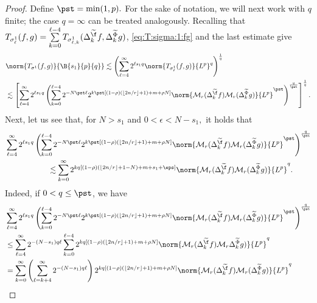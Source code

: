 \begin{proof}
  Define $\pst=\min(1,p).$  For the sake of notation, we will next work with $q$ finite; the case $q=\infty$ can be treated analogously.
  Recalling that $T_{\sigma^1_\ell}(f,g)= \sum\limits_{k=0}^{\ell -4} T_{\sigma^1_{\ell,k}}(\Delta^{\widetilde{\f}}_k f,\Delta^{\widetilde{\Phi}}_k g)$,  \eqref{eq:T:sigma:1:fg} and the last  estimate give
\begin{align}
& \norm{T_{\sigma^1}(f,g)}{\B{s_1}{p}{q}}  \lesssim  \left( \sum\limits_{\ell=4}^\infty 2^{\ell s_1q} \norm{T_{\sigma^1_\ell}(f,g)}{L^p}^q \right)^\frac{1}{q}\label{eq:T1:fg:Fqp}\\
& \lesssim  \left[  \sum\limits_{\ell=4}^\infty 2^{\ell s_1 q} \left(  \sum\limits_{k=0}^{\ell -4} 2^{- N\pst \ell} 2^{k\pst [(1-\rho)( \lfloor{2n/r}\rfloor + 1)+m+\rho N]}   \norm{\mathcal{M}_r(\Delta^{\widetilde{\f}}_kf)\mathcal{M}_r(\Delta^{\widetilde{\Phi}}_k g)}{L^p}^{\pst}\right)^\frac{q}{\pst} \right]^\frac{1}{q}. \nonumber
\end{align}
Next, let us see that, for  $N>s_1$ and $0<\epsilon< N-s_1,$  it holds that
\begin{align}\nonumber
& \sum\limits_{\ell=4}^\infty 2^{\ell  s_1 q} \left(  \sum\limits_{k=0}^{\ell -4} 2^{- N \pst\ell} 2^{k \pst[(1-\rho)( \lfloor{2n/r}\rfloor + 1)+m+\rho N]}    \norm{\mathcal{M}_r(\Delta^{\widetilde{\f}}_k f)\mathcal{M}_r(\Delta^{\widetilde{\Phi}}_kg)}{L^p}^{\pst}\right)^{\frac{q}{\pst}} \\ \label{eq:moving:the:sums}
&\hspace{2cm}\lesssim \sum\limits_{k=0}^\infty 2^{k q[ (1-\rho)( \lfloor{2n/r}\rfloor + 1-N) + m+ s_1+\eps] }   \norm{\mathcal{M}_r(\Delta^{\widetilde{\f}}_k f)\mathcal{M}_r(\Delta^{\widetilde{\Phi}}_k g)}{L^p}^q.
\end{align}
 Indeed, if $0 < q \leq \pst$, we have
\begin{align*}
& \sum\limits_{\ell=4}^\infty  2^{\ell  s_1 q} \left(  \sum\limits_{k=0}^{\ell -4} 2^{- N \pst \ell} 2^{k \pst [(1-\rho)( \lfloor{2n/r}\rfloor + 1)+m+\rho N]}   \norm{\mathcal{M}_r(\Delta^{\widetilde{\f}}_k f)\mathcal{M}_r(\Delta^{\widetilde{\Phi}}_k g)}{L^p}^{\pst}\right)^\frac{q}{\pst} \\
& \leq \sum\limits_{\ell=4}^\infty 2^{-(N-s_1) q \ell} \sum\limits_{k=0}^{\ell -4}  2^{k q [(1-\rho)( \lfloor{2n/r}\rfloor + 1) + m+\rho N]}   \norm{\mathcal{M}_r(\Delta^{\widetilde{\f}}_k f)\mathcal{M}_r\Delta^{\widetilde{\Phi}}_k g)}{L^p}^q\\
&= \sum_{k=0}^{\infty} \left(\sum_{\ell=k+4}^\infty 2^{-(N-s_1) q \ell} \right)  2^{k q [(1-\rho)( \lfloor{2n/r}\rfloor + 1) + m+\rho N]}   \norm{\mathcal{M}_r(\Delta^{\widetilde{\f}}_k f)\mathcal{M}_r(\Delta^{\widetilde{\Phi}}_k g)}{L^p}^q \\

\end{align*}
\end{proof}
